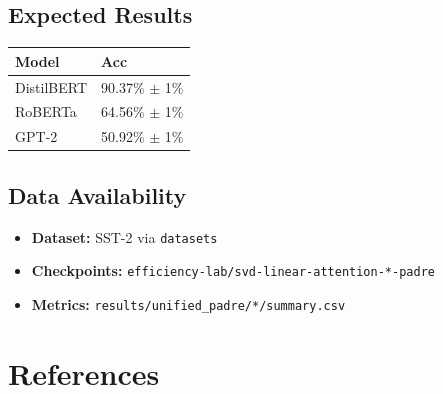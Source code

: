 \subsection{Expected Results}

\begin{table}[H]
\centering
\small
\begin{tabular}{ll}
\toprule
\textbf{Model} & \textbf{Acc} \\
\midrule
DistilBERT & 90.37\% $\pm$ 1\% \\
RoBERTa & 64.56\% $\pm$ 1\% \\
GPT-2 & 50.92\% $\pm$ 1\% \\
\bottomrule
\end{tabular}
\end{table}

\subsection{Data Availability}

\begin{itemize}
\item \textbf{Dataset:} SST-2 via \texttt{datasets}
\item \textbf{Checkpoints:} \texttt{efficiency-lab/svd-linear-attention-*-padre}
\item \textbf{Metrics:} \texttt{results/unified\_padre/*/summary.csv}

\end{itemize}


\section{References}


